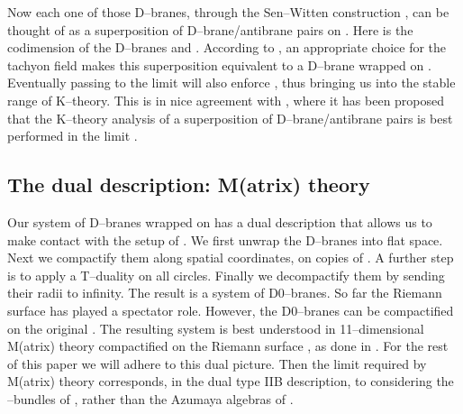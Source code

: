 \documentclass[a4paper,a4paper]{article}
\begin{document}
Now each one of those D\coordHE{}--branes, through the Sen--Witten construction 
\cite{WITTENDK, SEN}, can be thought of as a superposition of \coordHE{} 
D\coordHE{}--brane/antibrane pairs on \coordHE{}. Here \coordHE{} is the 
codimension of the D\coordHE{}--branes and \coordHE{}. According 
to \cite{WITTENDK, SEN}, an appropriate choice for the tachyon field makes 
this superposition equivalent to a D\coordHE{}--brane wrapped on \myHighlight{$\Sigma$}\coordHE{}. 
Eventually passing to the limit \coordHE{} will also enforce 
\coordHE{}, thus bringing us into the stable range of K--theory. 
This is in nice agreement with \cite{WITMICHIGAN, BOUWMATHAI}, 
where it has been proposed that the K--theory analysis of a superposition 
of \coordHE{} D\coordHE{}--brane/antibrane pairs is best performed 
in the limit \coordHE{}.  

\subsection{The dual description: M(atrix) theory}\label{dual}  
 
Our system of \coordHE{} D\coordHE{}--branes wrapped on \myHighlight{$\Sigma$}\coordHE{} has a dual description
that allows us to make contact with the setup of \cite{PROCEEDINGS}.
We first unwrap the D\coordHE{}--branes into flat space. Next we
compactify them along \coordHE{} spatial coordinates, on \coordHE{}
copies of \coordHE{}. A further step is to apply a T--duality on all \coordHE{} circles. 
Finally we decompactify them by sending their radii to infinity. 
The result is a system of \coordHE{} D0--branes. So far the Riemann surface 
\myHighlight{$\Sigma$}\coordHE{} has played a spectator role. However, the  
\coordHE{} D0--branes can be compactified on the original \myHighlight{$\Sigma$}\coordHE{}. 
The resulting system is best understood in 11--dimensional M(atrix) 
theory compactified on the Riemann surface \myHighlight{$\Sigma$}\coordHE{},
as done in \cite{PROCEEDINGS}. For the rest of this paper we will
adhere to this dual picture. Then the limit 
\coordHE{} \cite{LANDI} required by M(atrix) theory corresponds,
in the dual type IIB description, to considering the \coordHE{}--bundles
of \cite{BOUWMATHAI}, rather than the Azumaya algebras of \cite{KAPUSTIN}.
\end{document}

